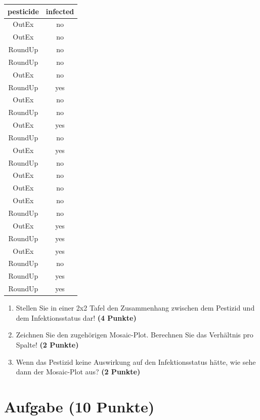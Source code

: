 \documentclass[a4paper, 9pt]{scrartcl}\usepackage[]{graphicx}\usepackage[]{xcolor}
\begin{document}
\begin{table}[!h]
\centering
\begin{tabular}{cc}
\toprule
pesticide & infected\\
\midrule
OutEx & no\\
OutEx & no\\
RoundUp & no\\
RoundUp & no\\
OutEx & no\\
\addlinespace
RoundUp & yes\\
OutEx & no\\
RoundUp & no\\
OutEx & yes\\
RoundUp & no\\
\addlinespace
OutEx & yes\\
RoundUp & no\\
OutEx & no\\
OutEx & no\\
OutEx & no\\
\addlinespace
RoundUp & no\\
OutEx & yes\\
RoundUp & yes\\
OutEx & yes\\
RoundUp & no\\
\addlinespace
RoundUp & yes\\
RoundUp & yes\\
\bottomrule
\end{tabular}
\end{table}



\begin{enumerate}
\item Stellen Sie in einer 2x2 Tafel den Zusammenhang zwischen dem
  Pestizid und dem Infektionsstatus dar! \textbf{(4 Punkte)}
\item Zeichnen Sie den zugeh{\"o}rigen Mosaic-Plot. Berechnen Sie das
  Verh{\"a}ltnis pro Spalte! \textbf{(2 Punkte)}
\item Wenn das Pestizid keine Auswirkung auf den Infektionsstatus h{\"a}tte, wie
  sehe dann der Mosaic-Plot aus? \textbf{(2 Punkte)}
\end{enumerate} 
\clearpage

\section{Aufgabe \hfill (10 Punkte)}
\end{document}
